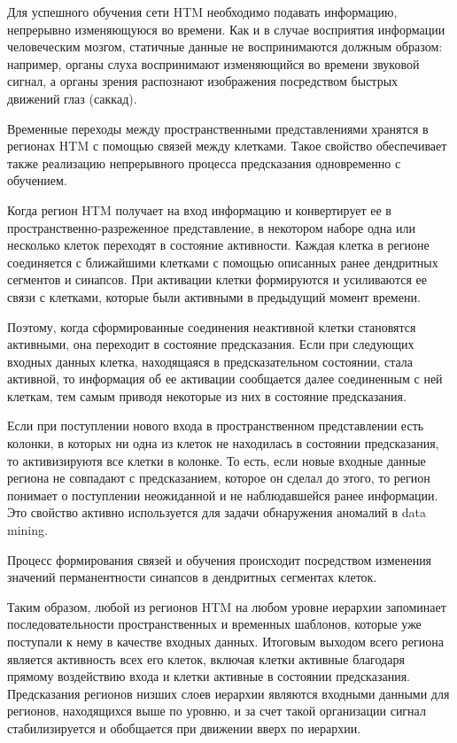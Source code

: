 Для успешного обучения сети HTM необходимо подавать информацию, непрерывно изменяющуюся во времени. Как и в случае восприятия информации человеческим мозгом, статичные данные не воспринимаются должным образом: например, органы слуха воспринимают изменяющийся во времени звуковой сигнал, а органы зрения распознают изображения посредством быстрых движений глаз (саккад).

Временные переходы между пространственными представлениями хранятся в регионах HTM с помощью связей между клетками. Такое свойство обеспечивает также реализацию непрерывного процесса предсказания одновременно с обучением. 

Когда регион HTM получает на вход информацию и конвертирует ее в пространственно-разреженное представление, в некотором наборе одна или несколько клеток переходят в состояние активности. Каждая клетка в регионе соединяется с ближайшими клетками с помощью описанных ранее дендритных сегментов и синапсов. При активации клетки формируются и усиливаются ее связи с клетками, которые были активными в предыдущий момент времени. 

Поэтому, когда сформированные соединения неактивной клетки становятся активными, она переходит в состояние предсказания. Если при следующих входных данных клетка, находящаяся в предсказательном состоянии, стала активной, то информация об ее активации сообщается далее соединенным с ней клеткам, тем самым приводя некоторые из них в состояние предсказания. 

Если при поступлении нового входа в пространственном представлении есть колонки, в которых ни одна из клеток не находилась в состоянии предсказания, то активизируютя все клетки в колонке.
То есть, если новые входные данные региона не совпадают с предсказанием, которое он сделал до этого, то регион понимает о поступлении неожиданной и не наблюдавшейся ранее информации. Это свойство активно используется для задачи обнаружения аномалий в data mining.

Процесс формирования связей и обучения происходит посредством изменения значений перманентности синапсов в дендритных сегментах клеток.

Таким образом, любой из регионов HTM на любом уровне иерархии запоминает последовательности пространственных и временных шаблонов, которые уже поступали к нему в качестве входных данных. Итоговым выходом всего региона является активность всех его клеток, включая клетки активные благодаря прямому воздействию входа и клетки активные в состоянии предсказания. Предсказания регионов низших слоев иерархии являются входными данными для регионов, находящихся выше по уровню, и за счет такой организации сигнал стабилизируется и обобщается при движении вверх по иерархии.
